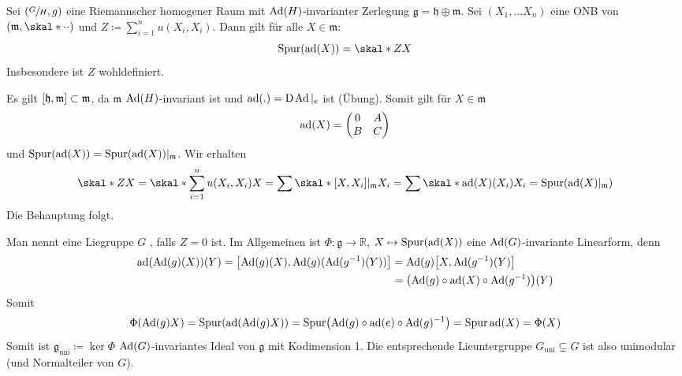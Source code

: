 \begin{lemma}
	Sei $\enbrace*{\sfrac{G}{H},g}$ eine Riemannscher homogener Raum mit $\Ad(H)$-invarianter Zerlegung $\mathfrak{g} = \mathfrak{h} \oplus \mathfrak{m}$.
	Sei $(X_1,\ldots X_n)$ eine ONB von $\enbrace*{\mathfrak{m},\skal*{\cdot }{\cdot}}$ und $Z \coloneqq \sum_{i=1}^{n} u(X_i,X_i)$.
	Dann gilt für alle $X \in \mathfrak{m}$:
	\[
		\operatorname{Spur} (\ad(X)) = \skal*{Z}{X}
	\]
	Insbesondere ist $Z$ wohldefiniert.
\end{lemma}
\begin{beweis}
	Es gilt $\benbrace*{\mathfrak{h},\mathfrak{m}} \subset \mathfrak{m}$, da $\mathfrak{m}$ $\Ad(H)$-invariant ist und $\ad(.) = \D \Ad|_e$ ist (Übung).
	Somit gilt für $X \in \mathfrak{m}$
	\[
		\ad(X) = \begin{pmatrix}
			0 & A \\ B & C
		\end{pmatrix}
	\]
	und $\operatorname{Spur} (\ad(X)) = \operatorname{Spur}(\ad(X))|_\mathfrak{m}$.
	Wir erhalten 
	\begin{align}
		\skal*{Z}{X} = \skal*{\sum_{i=1}^{n} u(X_i,X_i)}{X} = \sum \skal*{\benbrace*{X,X_i}|_\mathfrak{m}}{X_i} = \sum \skal*{\ad(X)(X_i)}{X_i} = \operatorname{Spur}(\ad(X)|_\mathfrak{m})
	\end{align}
	Die Behauptung folgt.
\end{beweis}

Man nennt eine Liegruppe $G$ , falls $Z=0$ ist.
Im Allgemeinen ist  $\Phi \colon \mathfrak{g} \to \mathbb{R}$, $X \mapsto \operatorname{Spur} (\ad(X))$  eine $\Ad(G)$-invariante Linearform, denn
\begin{align}
	\ad \enbrace*{\Ad(g)(X)}(Y) = \benbrace*{\Ad(g)(X),\Ad(g)(\Ad(g^{-1})(Y))} &= \Ad(g) \benbrace*{X, \Ad(g^{-1})(Y)} \\
	&= \enbrace*{\Ad(g) \circ \ad(X) \circ \Ad(g^{-1})}(Y)
\end{align}
Somit 
\[
	\Phi \enbrace*{\Ad(g) X} = \operatorname{Spur} \enbrace*{\ad \enbrace*{\Ad(g) X}} = \operatorname{Spur} \enbrace*{\Ad(g) \circ \ad(e) \circ \Ad(g)^{-1}} = \operatorname{Spur} \ad(X) = \Phi(X)
\]
Somit ist $\mathfrak{g}_\mathrm{uni} \coloneq \ker \Phi$ $\Ad(G)$-invariantes Ideal von $\mathfrak{g}$ mit Kodimension 1.
Die entsprechende Lieuntergruppe $G_\mathrm{uni} \subsetneq G$ ist also unimodular (und Normalteiler von $G$).

